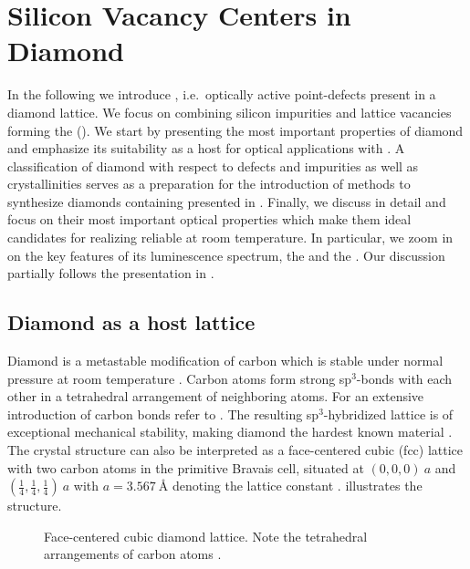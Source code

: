 
\chapter{Silicon Vacancy Centers in Diamond}	\label{ch::sivs}

  In the following we introduce \ccs, i.e.\ optically active point-defects present in a diamond lattice.
  We focus on \ccs combining silicon impurities and lattice vacancies forming the \sivc (\siv).
  We start by presenting the most important properties of diamond and emphasize its suitability as a host for optical applications with \ccs.
  A classification of diamond with respect to defects and impurities as well as crystallinities serves as a preparation for the introduction of methods to synthesize diamonds containing \sivs presented in .
  Finally, we discuss \sivs in detail and focus on their most important optical properties which make them ideal candidates for realizing reliable \spss at room temperature.
  In particular, we zoom in on the key features of its luminescence spectrum, the \zpl and the \psb.
  Our discussion partially follows the presentation in \cite{Riedrich-moller2014, Neu2012, BeckerMasterThesis, Steinmetz2011}.

\section{Diamond as a host lattice}

  Diamond is a metastable modification of carbon which is stable under normal pressure at room temperature \cite{Bundy1989}. Carbon atoms form strong sp$^3$-bonds with each other in a tetrahedral arrangement of neighboring atoms. For an extensive introduction of carbon bonds refer to . The resulting sp$^3$-hybridized lattice is of exceptional mechanical stability, making diamond the hardest known material \cite{telling2000theoretical}.
  The crystal structure can also be interpreted as a face-centered cubic (fcc) lattice with two carbon atoms in the primitive Bravais cell, situated at $(0,0,0) \ a$ and $ (\frac{1}{4}, \frac{1}{4}, \frac{1}{4}) \ a$ with $a = \SI{3.567}{\angstrom}$ denoting the lattice constant \cite{Saotome1998}.  illustrates the structure.

  \begin{figure}[htbp]
		\centering
		\caption[Face-centered cubic diamond lattice]{Face-centered cubic diamond lattice. Note the tetrahedral arrangements of carbon atoms \cite{demtroder2000experimentalphysik}.}
		\label{fig::diamond_lattice}
	\end{figure}

